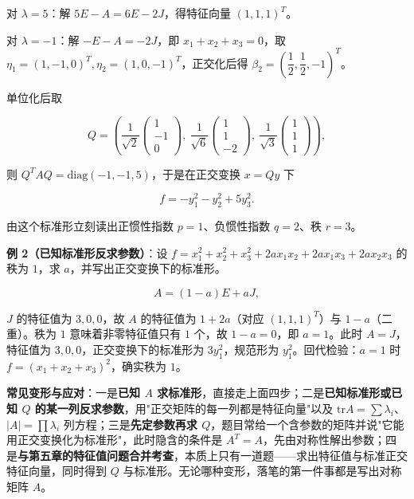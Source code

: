 \documentclass[11pt,openany,UTF8]{ctexbook}
\begin{document}
对 $\lambda=5$：解 $5E-A=6E-2J$，得特征向量 $(1,1,1)^T$。

对 $\lambda=-1$：解 $-E-A=-2J$，即 $x_1+x_2+x_3=0$，取 $\eta_1=(1,-1,0)^T,\eta_2=(1,0,-1)^T$，正交化后得 $\beta_2=\left(\dfrac12,\dfrac12,-1\right)^T$。

单位化后取

\[Q=\left(\frac{1}{\sqrt2}\begin{pmatrix}1\\-1\\0\end{pmatrix},\ \frac{1}{\sqrt6}\begin{pmatrix}1\\1\\-2\end{pmatrix},\ \frac{1}{\sqrt3}\begin{pmatrix}1\\1\\1\end{pmatrix}\right),\]

则 $Q^TAQ=\mathrm{diag}(-1,-1,5)$，于是在正交变换 $x=Qy$ 下

\[f=-y_1^2-y_2^2+5y_3^2 .\]

由这个标准形立刻读出正惯性指数 $p=1$、负惯性指数 $q=2$、秩 $r=3$。

\textbf{例 2（已知标准形反求参数）}：设 $f=x_1^2+x_2^2+x_3^2+2ax_1x_2+2ax_1x_3+2ax_2x_3$ 的秩为 $1$，求 $a$，并写出正交变换下的标准形。

\[A=(1-a)E+aJ,\]

$J$ 的特征值为 $3,0,0$，故 $A$ 的特征值为 $1+2a$（对应 $(1,1,1)^T$）与 $1-a$（二重）。秩为 $1$ 意味着非零特征值只有 $1$ 个，故 $1-a=0$，即 $a=1$。此时 $A=J$，特征值为 $3,0,0$，正交变换下的标准形为 $3y_1^2$，规范形为 $y_1^2$。回代检验：$a=1$ 时 $f=(x_1+x_2+x_3)^2$，确实秩为 $1$。

\textbf{常见变形与应对}：一是\textbf{已知 $A$ 求标准形}，直接走上面四步；二是\textbf{已知标准形或已知 $Q$ 的某一列反求参数}，用"正交矩阵的每一列都是特征向量"以及 $\mathrm{tr}A=\sum\lambda_i$、$\vert A\vert=\prod\lambda_i$ 列方程；三是\textbf{先定参数再求 $Q$}，题目常给一个含参数的矩阵并说"它能用正交变换化为标准形"，此时隐含的条件是 $A^T=A$，先由对称性解出参数；四是\textbf{与第五章的特征值问题合并考查}，本质上只有一道题——求出特征值与标准正交特征向量，同时得到 $Q$ 与标准形。无论哪种变形，落笔的第一件事都是写出对称矩阵 $A$。
\end{document}
